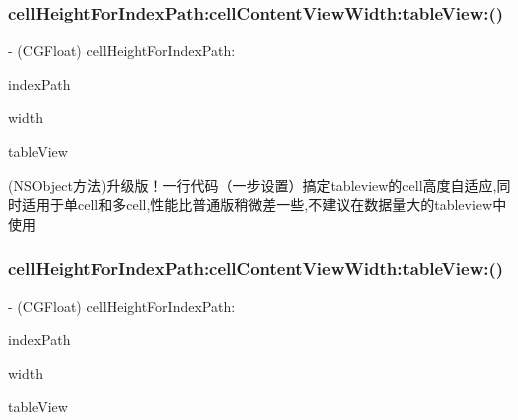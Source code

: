 \subsubsection{\texorpdfstring{cell\+Height\+For\+Index\+Path\+:cell\+Content\+View\+Width\+:table\+View\+:()}{cellHeightForIndexPath:cellContentViewWidth:tableView:()}\hspace{0.1cm}{\footnotesize\ttfamily [1/3]}}
{\footnotesize\ttfamily -\/ (C\+G\+Float) cell\+Height\+For\+Index\+Path\+: \begin{DoxyParamCaption}\item[{(N\+S\+Index\+Path $\ast$)}]{index\+Path }\item[{cellContentViewWidth:(C\+G\+Float)}]{width }\item[{tableView:(U\+I\+Table\+View $\ast$)}]{table\+View }\end{DoxyParamCaption}}

(N\+S\+Object方法)升级版！一行代码（一步设置）搞定tableview的cell高度自适应,同时适用于单cell和多cell,性能比普通版稍微差一些,不建议在数据量大的tableview中使用 \mbox{\label{category_n_s_object_07_s_d_any_object_auto_cell_height_08_aa618c83e951010f546ea1f085eae72c7}} 
\subsubsection{\texorpdfstring{cell\+Height\+For\+Index\+Path\+:cell\+Content\+View\+Width\+:table\+View\+:()}{cellHeightForIndexPath:cellContentViewWidth:tableView:()}\hspace{0.1cm}{\footnotesize\ttfamily [2/3]}}
{\footnotesize\ttfamily -\/ (C\+G\+Float) cell\+Height\+For\+Index\+Path\+: \begin{DoxyParamCaption}\item[{(N\+S\+Index\+Path $\ast$)}]{index\+Path }\item[{cellContentViewWidth:(C\+G\+Float)}]{width }\item[{tableView:(U\+I\+Table\+View $\ast$)}]{table\+View }\end{DoxyParamCaption}}

